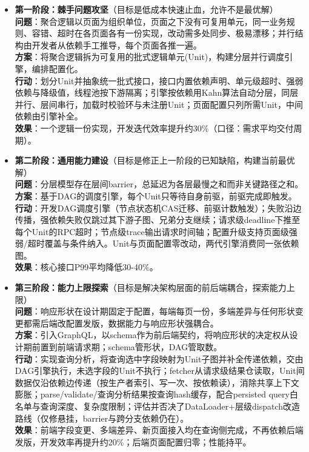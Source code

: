 \documentclass{resume}
\begin{document}
\begin{onehalfspacing}
\begin{itemize}
    \item \textbf{第一阶段：棘手问题攻坚}（目标是低成本快速止血，允许不是最优解）\\
    \textbf{问题}：聚合逻辑以页面为组织单位，页面之下没有可复用单元，同一业务规则、容错、超时在各页面各有一份实现，改动需多处同步、极易漂移；并行结构由开发者从依赖手工推导，每个页面各推一遍。\\
    \textbf{方案}：将聚合逻辑拆为可复用的批式逻辑单元(Unit)，构建分层并行调度引擎，编排配置化。\\
    \textbf{行动}：划分Unit并抽象统一批式接口，接口内置依赖声明、单元级超时、强弱依赖与降级值，线程池按下游隔离；引擎按依赖用Kahn算法自动分层，同层并行、层间串行，加载时校验环与未注册Unit；页面配置只列所需Unit，中间依赖由引擎补全。\\
    \textbf{效果}：一个逻辑一份实现，开发迭代效率提升约30\%（口径：需求平均交付周期）。\\
    \item \textbf{第二阶段：通用能力建设}（目标是修正上一阶段的已知缺陷，构建当前最优解）\\
    \textbf{问题}：分层模型存在层间barrier，总延迟为各层最慢之和而非关键路径之和。\\
    \textbf{方案}：基于DAG的调度引擎，每个Unit只等待自身前驱，前驱完成即触发。\\
    \textbf{行动}：开发DAG调度引擎（节点状态机CAS迁移、前驱计数触发）；失败沿边传播，强依赖失败仅跳过其下游子图、兄弟分支继续；请求级deadline下推至每个Unit的RPC超时；节点级trace输出请求时间轴；配置升级支持页面级强弱/超时覆盖与条件纳入。Unit与页面配置零改动，两代引擎消费同一张依赖图。\\
    \textbf{效果}：核心接口P99平均降低30-40\%。\\
    \item \textbf{第三阶段：能力上限探索}（目标是解决架构层面的前后端耦合，探索能力上限）\\
    \textbf{问题}：响应形状在设计期固定于配置，每端每页一份，多端差异与任何形状变更都需后端改配置发版，数据能力与响应形状强耦合。\\
    \textbf{方案}：引入GraphQL，以schema作为前后端契约，将响应形状的决定权从设计期前置到前端请求期；schema管形状，DAG管取数。\\
    \textbf{行动}：实现查询分析，将查询选中字段映射为Unit子图并补全传递依赖，交由DAG引擎执行，未选字段的Unit不执行；fetcher从请求级结果仓读取，Unit间数据仅沿依赖边传递（按生产者索引、写一次、按依赖读），消除共享上下文膨胀；parse/validate/查询分析结果按查询hash缓存，配合persisted query白名单与查询深度、复杂度限制；评估并否决了DataLoader+层级dispatch改造路线（仅修悬挂，barrier与跨分支依赖仍在）。\\
    \textbf{效果}：前端字段变更、多端差异、新页面接入均在查询侧完成，不再依赖后端发版，开发效率再提升约20\%；后端页面配置归零；性能持平。\\
\end{itemize}
\end{onehalfspacing}
\end{document}
